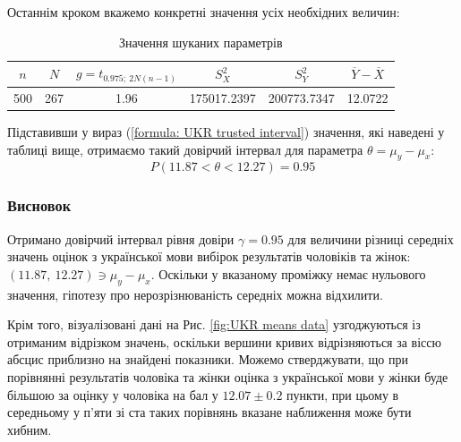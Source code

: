 Останнім кроком вкажемо конкретні значення усіх необхідних величин:

\vspace{0.8cm}
\begin{table}[H]
    \begin{center}
        \begin{tabular}{||c|c|c|c|c|c||}
            \hline
            $n$ & $N$ & $g=t_{0.975;\ 2N(n-1)}$ & $S_X^2$ & $S_Y^2$ & $\overline{Y}-\overline{X}$ \\
            \hline \hline
            500 & 267 & 1.96 & 175017.2397 & 200773.7347 & 12.0722 \\
            \hline
        \end{tabular}
        \caption{Значення шуканих параметрів}
        \label{table: UKR interval}
    \end{center}
\end{table}

Підставивши у вираз (\ref{formula: UKR trusted interval}) значення, які наведені у таблиці вище, отримаємо такий довірчий 
інтервал для параметра $\theta=\mu_y-\mu_x$:
\begin{equation*}
    P(11.87 < \theta < 12.27)=0.95
\end{equation*}

\subsubsection*{Висновок}

Отримано довірчий інтервал рівня довіри $\gamma=0.95$ для величини різниці середніх значень 
оцінок з української мови вибірок результатів чоловіків та жінок: $(11.87,\ 12.27)\ni \mu_y-\mu_x$. Оскільки 
у вказаному проміжку немає нульового значення, гіпотезу про нерозрізнюваність середніх можна відхилити. 

Крім того, візуалізовані дані на Рис. \ref{fig:UKR means data} узгоджуються із отриманим відрізком значень, 
оскільки вершини кривих відрізняються за віссю абсцис приблизно на знай\-дені показники. Можемо стверджувати, 
що при порівнянні результатів чоловіка та жінки оцінка з української мови у жінки буде більшою за оцінку у 
чоловіка на бал у $12.07\pm 0.2$ пункти, при цьому в середньому у п'яти зі ста таких порівнянь вказане 
наближення може бути хибним.